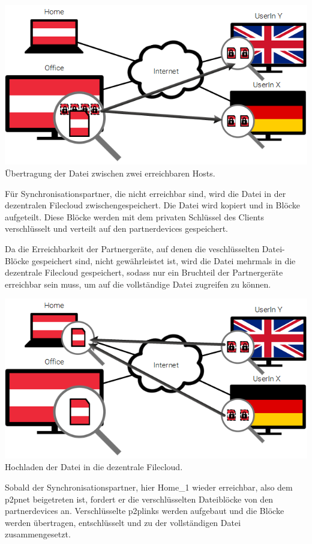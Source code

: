 \includegraphics[]{images/sblit_1}
Übertragung der Datei zwischen zwei erreichbaren Hosts.

Für Synchronisationspartner, die nicht erreichbar sind, wird die Datei in der
\gls{dezentralen Filecloud} zwischengespeichert. Die Datei wird kopiert und in Blöcke
aufgeteilt. Diese Blöcke werden mit dem privaten Schlüssel des Clients
verschlüsselt und verteilt auf den \glspl{partnerdevice} gespeichert.

Da die Erreichbarkeit der Partnergeräte, auf denen die veschlüsselten
Datei-Blöcke gespeichert sind, nicht gewährleistet ist, wird die Datei mehrmals
in die \gls{dezentrale Filecloud} gespeichert, sodass nur ein Bruchteil der
Partnergeräte erreichbar sein muss, um auf die vollständige Datei zugreifen zu
können.

\includegraphics[]{images/sblit_2}
Hochladen der Datei in die dezentrale Filecloud.

Sobald der Synchronisationspartner, hier Home_1 wieder erreichbar, also dem
\gls{p2pnet} beigetreten ist, fordert er die verschlüsselten
Dateiblöcke von den \glspl{partnerdevice} an. Verschlüsselte \glspl{p2plink}
werden aufgebaut und die Blöcke werden übertragen, entschlüsselt und zu der
vollständigen Datei zusammengesetzt.

